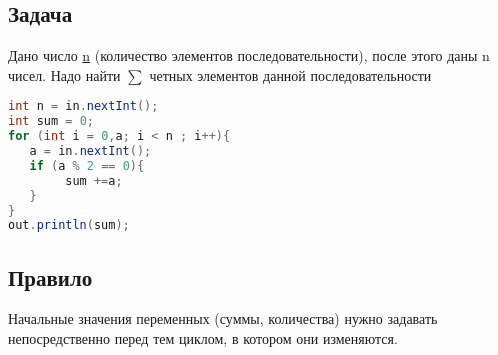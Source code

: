 \documentclass{article}
\begin{document}
\subsection{Задача}
Дано число \underline{n} (количество элементов последовательности), после этого даны n чисел.
Надо найти $\sum$ четных элементов данной последовательности
\begin{lstlisting}[language=Java] 
int n = in.nextInt(); 
int sum = 0;
for (int i = 0,a; i < n ; i++){
   a = in.nextInt();
   if (a % 2 == 0){
        sum +=a;
   }
}
out.println(sum);
\end{lstlisting} 
\subsection{Правило}
 
Начальные значения переменных (суммы, количества) нужно задавать
непосредственно перед тем циклом, в котором они изменяются.
\end{document}
